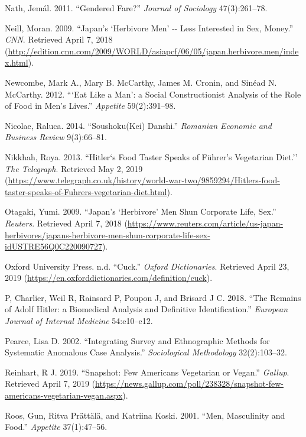 \documentclass[twoside]{report}
\begin{document}
\begin{multicols*}{2}
\hypertarget{nath}{Nath, Jemál. 2011. ``Gendered Fare?'' \emph{Journal of Sociology}
47(3):261--78.}

\hypertarget{neill}{Neill, Moran. 2009. ``Japan's `Herbivore Men' -\/- Less Interested in
Sex, Money.'' \emph{CNN}. Retrieved April 7, 2018
(\url{http://edition.cnn.com/2009/WORLD/asiapcf/06/05/japan.herbivore.men/index.html}).}

\hypertarget{newcombe}{Newcombe, Mark A., Mary B. McCarthy, James M. Cronin, and Sinéad N.
McCarthy. 2012. ```Eat Like a Man': a Social Constructionist Analysis of
the Role of Food in Men's Lives.'' \emph{Appetite} 59(2):391--98.}

\hypertarget{nicolae}{Nicolae, Raluca. 2014. ``Soushoku(Kei) Danshi.'' \emph{Romanian Economic
and Business Review} 9(3):66--81.}

\hypertarget{nikkhah}{Nikkhah, Roya. 2013. ``Hitler`s Food Taster Speaks of Führer's
Vegetarian Diet.'' \emph{The Telegraph}. Retrieved May 2, 2019
(\url{https://www.telegraph.co.uk/history/world-war-two/9859294/Hitlers-food-taster-speaks-of-Fuhrers-vegetarian-diet.html}).}

\hypertarget{otagaki}{Otagaki, Yumi. 2009. ``Japan's `Herbivore' Men Shun Corporate Life,
Sex.'' \emph{Reuters}. Retrieved April 7, 2018
(\url{https://www.reuters.com/article/us-japan-herbivores/japans-herbivore-men-shun-corporate-life-sex-idUSTRE56Q0C220090727}).}

\hypertarget{oxford}{Oxford University Press. n.d. ``Cuck.'' \emph{Oxford Dictionaries}.
Retrieved April 23, 2019
(\url{https://en.oxforddictionaries.com/definition/cuck}).}

\hypertarget{p}{P, Charlier, Weil R, Rainsard P, Poupon J, and Brisard J C. 2018. ``The
Remains of Adolf Hitler: a Biomedical Analysis and Definitive
Identification.'' \emph{European Journal of Internal Medicine}
54:e10--e12.}

\hypertarget{pearce}{Pearce, Lisa D. 2002. ``Integrating Survey and Ethnographic Methods for
Systematic Anomalous Case Analysis.'' \emph{Sociological Methodology}
32(2):103--32.}

\hypertarget{reinhart}{Reinhart, R J. 2019. ``Snapshot: Few Americans Vegetarian or Vegan.''
\emph{Gallup}. Retrieved April 7, 2019
(\href{https://news.gallup.com/poll/238328/snapshot-few-americans-vegetarian-ve-gan.aspx}{https://news.gallup.com/poll/238328/snapshot-few-americans-vegetarian-vegan.aspx}).}

\hypertarget{roos}{Roos, Gun, Ritva Prättälä, and Katriina Koski. 2001. ``Men, Masculinity
and Food.'' \emph{Appetite} 37(1):47--56.}


\end{multicols*}
\end{document}
